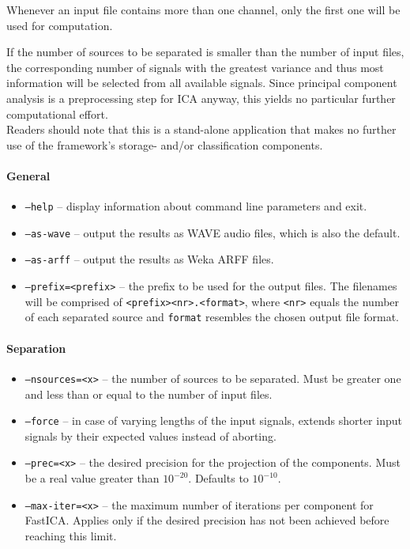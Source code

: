 Whenever an input file contains more than one channel, only the first one will
be used for computation.

If the number of sources to be separated is smaller than the number of input
files, the corresponding number of signals with the greatest variance and thus
most information will be selected from all available signals. Since principal
component analysis is a preprocessing step for ICA anyway, this yields no
particular further computational effort.\\

Readers should note that this is a stand-alone application that makes no further
use of the framework's storage- and/or classification components.


\paragraph{General}

\begin{itemize}
  \item {\tt --help} -- display information about command line parameters and
    exit.
  \item {\tt --as-wave} -- output the results as WAVE audio files, which is
    also the default.
  \item {\tt --as-arff} -- output the results as Weka ARFF files.
  \item {\tt --prefix=<prefix>} -- the prefix to be used for the output
    files. The filenames will be comprised of \verb!<prefix><nr>.<format>!,
    where \verb!<nr>! equals the number of each separated source and
    \verb!format!  resembles the chosen output file format.
\end{itemize}

\paragraph{Separation}

\begin{itemize}
  \item {\tt --nsources=<x>} -- the number of sources to be separated. Must be
    greater one and less than or equal to the number of input files.
  \item {\tt --force} -- in case of varying lengths of the input signals,
    extends shorter input signals by their expected values instead of aborting.
  \item {\tt --prec=<x>} -- the desired precision for the projection of the
    components. Must be a real value greater than $10^{-20}$. Defaults to
    $10^{-10}$.
  \item {\tt --max-iter=<x>} -- the maximum number of iterations per component
    for FastICA. Applies only if the desired precision has not been achieved
    before reaching this limit.
\end{itemize}


